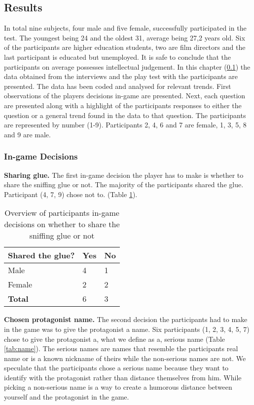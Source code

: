 \subsection{Results} \label{Results}
In total nine subjects, four male and five female, successfully participated in the test. The youngest being 24 and the oldest 31, average being 27,2 years old. Six of the participants are higher education students, two are film directors and the last participant is educated but unemployed. It is safe to conclude that the participants on average possesses intellectual judgement. In this chapter (\ref{Results}) the data obtained from the interviews and the play test with the participants are presented. The data has been coded and analysed for relevant trends. First observations of the players decisions in-game are presented. Next, each question are presented along with a highlight of the participants responses to either the question or a general trend found in the data to that question. The participants are represented by number (1-9). Participants 2, 4, 6 and 7 are female, 1, 3, 5, 8 and 9 are male. 

\subsubsection{In-game Decisions} \label{ingamedec}

\textbf{Sharing glue.} The first in-game decision the player has to make is whether to share the sniffing glue or not. The majority of the participants shared the glue. Participant (4, 7, 9) chose not to. (Table \ref{tab:glue}).

\begin{table}[h]
\centering
\begin{tabular}{l l l}
\hline
\textbf{Shared the glue?} & Yes & No \\
\hline
Male & 4 & 1 \\
Female & 2 & 2 \\
\textbf{Total} & 6 & 3 \\
\hline
\end{tabular}
\caption{\label{tab:glue}Overview of participants in-game decisions on whether to share the sniffing glue or not}
\end{table}


\textbf{Chosen protagonist name.} The second decision the participants had to make in the game was to give the protagonist a name. Six participants (1, 2, 3, 4, 5, 7) chose to give the protagonist a, what we define as a, serious name (Table \ref{tab:name}). The serious names are names that resemble the participants real name or is a known nickname of theirs while the non-serious names are not. We speculate that the participants chose a serious name because they want to identify with the protagonist rather than distance themselves from him. While picking a non-serious name is a way to create a humorous distance between yourself and the protagonist in the game.

